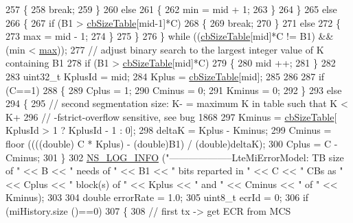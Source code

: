 \begin{DoxyCode}
257             \{
258               \textcolor{keywordflow}{break};
259             \}
260           \textcolor{keywordflow}{else}
261             \{
262               min = mid + 1;
263             \}
264         \}
265       \textcolor{keywordflow}{else}
266         \{
267           \textcolor{keywordflow}{if} (B1 > \hyperlink{namespacens3_a14a1917c5d5a089d32d5d29e3c380ab9}{cbSizeTable}[mid-1]*C)
268             \{
269               \textcolor{keywordflow}{break};
270             \}
271           \textcolor{keywordflow}{else}
272             \{
273               max = mid - 1;
274             \}
275         \}
276   \} \textcolor{keywordflow}{while} ((\hyperlink{namespacens3_a14a1917c5d5a089d32d5d29e3c380ab9}{cbSizeTable}[mid]*C != B1) && (min < \hyperlink{80211b_8c_affe776513b24d84b39af8ab0930fef7f}{max}));
277   \textcolor{comment}{// adjust binary search to the largest integer value of K containing B1}
278   \textcolor{keywordflow}{if} (B1 > \hyperlink{namespacens3_a14a1917c5d5a089d32d5d29e3c380ab9}{cbSizeTable}[mid]*C)
279     \{
280       mid ++;
281     \}
282 
283   uint32\_t KplusId = mid;
284   Kplus = \hyperlink{namespacens3_a14a1917c5d5a089d32d5d29e3c380ab9}{cbSizeTable}[mid];
285 
286 
287   \textcolor{keywordflow}{if} (C==1)
288     \{
289       Cplus = 1;
290       Cminus = 0;
291       Kminus = 0;
292     \}
293   \textcolor{keywordflow}{else}
294     \{
295       \textcolor{comment}{// second segmentation size: K- = maximum K in table such that K < K+}
296       \textcolor{comment}{// -fstrict-overflow sensitive, see bug 1868}
297       Kminus = \hyperlink{namespacens3_a14a1917c5d5a089d32d5d29e3c380ab9}{cbSizeTable}[ KplusId > 1 ? KplusId - 1 : 0];
298       deltaK = Kplus - Kminus;
299       Cminus = floor ((((\textcolor{keywordtype}{double}) C * Kplus) - (\textcolor{keywordtype}{double})B1) / (\textcolor{keywordtype}{double})deltaK);
300       Cplus = C - Cminus;
301     \}
302   \hyperlink{group__logging_gafbd73ee2cf9f26b319f49086d8e860fb}{NS\_LOG\_INFO} (\textcolor{stringliteral}{"--------------------LteMiErrorModel: TB size of "} << B << \textcolor{stringliteral}{" needs of "} << B1 << \textcolor{stringliteral}{
      " bits reparted in "} << C << \textcolor{stringliteral}{" CBs as "}<< Cplus << \textcolor{stringliteral}{" block(s) of "} << Kplus << \textcolor{stringliteral}{" and "} << Cminus << \textcolor{stringliteral}{" of "} 
      << Kminus);
303 
304   \textcolor{keywordtype}{double} errorRate = 1.0;
305   uint8\_t ecrId = 0;
306   \textcolor{keywordflow}{if} (miHistory.size ()==0)
307     \{
308       \textcolor{comment}{// first tx -> get ECR from MCS}

\end{DoxyCode}
